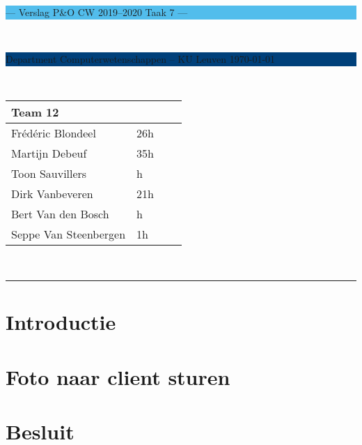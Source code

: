 \documentclass[a4paper,11pt]{article}
\begin{document}
\noindent
\colorbox[HTML]{52BDEC}{\bfseries\parbox{\textwidth}{\centering\large
  --- Verslag P\&O CW 2019--2020 Taak 7 ---
}}
\\[-1mm]
\colorbox[HTML]{00407A}{\bfseries\color{white}\parbox{\textwidth}{
  Department Computerwetenschappen -- KU Leuven
  \hfill
  \today
}}
\\

\smallskip

\noindent

\begin{tabular}{*4l}
\toprule
\multicolumn{2}{l}{\large\textbf{Team 12}} \\
\midrule
Frédéric Blondeel & 26h \\
Martijn Debeuf & 35h \\
Toon Sauvillers & h \\ %
Dirk Vanbeveren & 21h \\
Bert Van den Bosch & h \\
Seppe Van Steenbergen & 1h \\


\bottomrule
\hline
\end{tabular}\\

\noindent
{\color[HTML]{52BDEC} \rule{\linewidth}{1mm} }
\tableofcontents
\newpage
\section{Introductie}\label{sec:introductie}



\section{Foto naar client sturen}



\section{Besluit}\label{sec:besluit}


\newpage



\end{document}
